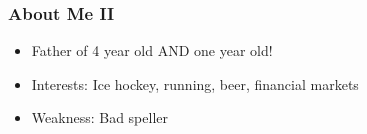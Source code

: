 \documentclass[10pt]{beamer}
\begin{document}


\begin{frame}[t]
\frametitle{About Me II}
\begin{itemize}
\item Father of 4 year old AND one year old!%
\medskip
\item Interests: Ice hockey, running, beer, financial markets
\medskip
\item Weakness: Bad speller
\end{itemize}
\bigskip
\end{frame}
\end{document}
